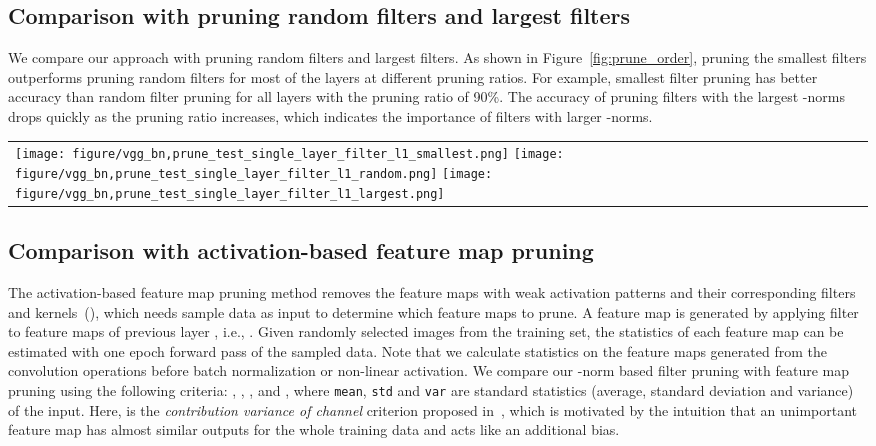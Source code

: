 \documentclass{article} \usepackage{iclr2017_conference,times}
\begin{document}
\subsection{Comparison with pruning random filters and largest filters}
\label{sec:random_largest_filters}
We compare our approach with pruning random filters and largest filters.
As shown in Figure~\ref{fig:prune_order}, pruning the smallest filters outperforms pruning random filters for most of the layers at different pruning ratios. 
For example, smallest filter pruning has better accuracy than random filter pruning for all layers with the pruning ratio of 90\%.
The accuracy of pruning filters with the largest -norms drops quickly as the pruning ratio increases, which indicates the importance of filters with larger -norms.

\begin{figure*}[h]
\centering
\begin{tabular}{l}
      \texttt{[image: figure/vgg\_bn,prune\_test\_single\_layer\_filter\_l1\_smallest.png]}
      \texttt{[image: figure/vgg\_bn,prune\_test\_single\_layer\_filter\_l1\_random.png]}
      \texttt{[image: figure/vgg\_bn,prune\_test\_single\_layer\_filter\_l1\_largest.png]}\\
\end{tabular}
\caption{Comparison of three pruning methods for VGG-16 on CIFAR-10: pruning the smallest filters, pruning random filters and pruning the largest filters. 
In random filter pruning, the order of filters to be pruned is randomly permuted.
}
\label{fig:prune_order}
\end{figure*}

\subsection{Comparison with activation-based feature map pruning}
\label{sec:pruning_activation}
The activation-based feature map pruning method removes the feature maps with weak activation patterns and their corresponding filters and kernels~(\cite{polyak2015channel}), which needs sample data as input to determine which feature maps to prune.
A feature map  is generated by applying filter  to feature maps of previous layer , i.e., . 
Given  randomly selected images  from the training set, the statistics of each feature map can be estimated with one epoch forward pass of the  sampled data. 
Note that we calculate statistics on the feature maps generated from the convolution operations before batch normalization or non-linear activation.
We compare our -norm based filter pruning with feature map pruning using the following criteria:
, 
,
,
 and 
,
where \texttt{mean}, \texttt{std} and \texttt{var} are standard statistics (average, standard deviation and variance) of the input.
Here,  is the \emph{contribution variance of channel} criterion proposed in~\cite{polyak2015channel}, 
which is motivated by the intuition that an unimportant feature map has almost similar outputs for the whole training data and acts like an additional bias.
\end{document}
